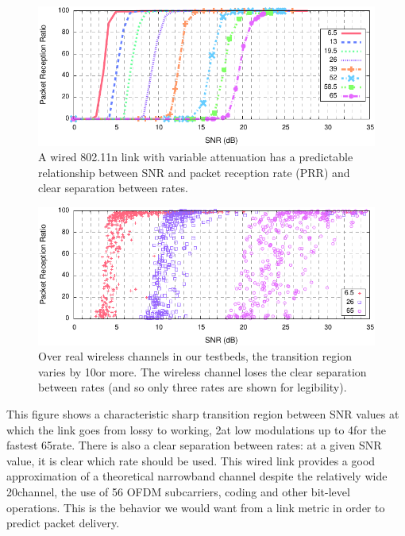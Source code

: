 \begin{figure}[t!]
	\centering
	\includegraphics[width=\textwidth]{figures/snr_prr_atten.pdf}
	\caption[SNR vs PRR for a wired 802.11n link]{\label{fig:snr_prr_attenuator}A wired 802.11n link with variable attenuation has a predictable relationship between SNR and packet reception rate (PRR) and clear separation between rates.}
\end{figure}
\begin{figure}[t!]
	\centering
	\includegraphics[width=\textwidth]{figures/snr_prr_scatter.pdf}
	\caption[SNR vs PRR for many wireless 802.11n channels]{\label{fig:snr_prr_26_65} Over real wireless channels in our testbeds, the transition region varies by 10\dB or more. The wireless channel loses the clear separation between rates (and so only three rates are shown for legibility).}%
\end{figure}

This figure shows a characteristic sharp transition region between SNR values at which the link goes from lossy to working, 2\dB at low modulations up to 4\dB for the fastest 65\Mbps rate. There is also a clear separation between rates: at a given SNR value, it is clear which rate should be used. This wired link provides a good approximation of a theoretical narrowband channel despite the relatively wide 20\MHz channel, the use of 56 OFDM subcarriers, coding and other bit-level operations. This is the behavior we would want from a link metric in order to predict packet delivery.

